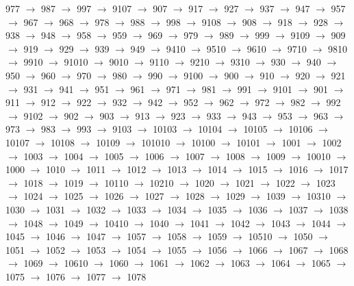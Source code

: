 977 $\rightarrow$ 987 $\rightarrow$ 997 $\rightarrow$ 9107 $\rightarrow$ 907 $\rightarrow$ 917 $\rightarrow$ 927 $\rightarrow$ 937 $\rightarrow$ 947 $\rightarrow$ 957 $\rightarrow$ 967 $\rightarrow$ 968 $\rightarrow$ 978 $\rightarrow$ 988 $\rightarrow$ 998 $\rightarrow$ 9108 $\rightarrow$ 908 $\rightarrow$ 918 $\rightarrow$ 928 $\rightarrow$ 938 $\rightarrow$ 948 $\rightarrow$ 958 $\rightarrow$ 959 $\rightarrow$ 969 $\rightarrow$ 979 $\rightarrow$ 989 $\rightarrow$ 999 $\rightarrow$ 9109 $\rightarrow$ 909 $\rightarrow$ 919 $\rightarrow$ 929 $\rightarrow$ 939 $\rightarrow$ 949 $\rightarrow$ 9410 $\rightarrow$ 9510 $\rightarrow$ 9610 $\rightarrow$ 9710 $\rightarrow$ 9810 $\rightarrow$ 9910 $\rightarrow$ 91010 $\rightarrow$ 9010 $\rightarrow$ 9110 $\rightarrow$ 9210 $\rightarrow$ 9310 $\rightarrow$ 930 $\rightarrow$ 940 $\rightarrow$ 950 $\rightarrow$ 960 $\rightarrow$ 970 $\rightarrow$ 980 $\rightarrow$ 990 $\rightarrow$ 9100 $\rightarrow$ 900 $\rightarrow$ 910 $\rightarrow$ 920 $\rightarrow$ 921 $\rightarrow$ 931 $\rightarrow$ 941 $\rightarrow$ 951 $\rightarrow$ 961 $\rightarrow$ 971 $\rightarrow$ 981 $\rightarrow$ 991 $\rightarrow$ 9101 $\rightarrow$ 901 $\rightarrow$ 911 $\rightarrow$ 912 $\rightarrow$ 922 $\rightarrow$ 932 $\rightarrow$ 942 $\rightarrow$ 952 $\rightarrow$ 962 $\rightarrow$ 972 $\rightarrow$ 982 $\rightarrow$ 992 $\rightarrow$ 9102 $\rightarrow$ 902 $\rightarrow$ 903 $\rightarrow$ 913 $\rightarrow$ 923 $\rightarrow$ 933 $\rightarrow$ 943 $\rightarrow$ 953 $\rightarrow$ 963 $\rightarrow$ 973 $\rightarrow$ 983 $\rightarrow$ 993 $\rightarrow$ 9103 $\rightarrow$ 10103 $\rightarrow$ 10104 $\rightarrow$ 10105 $\rightarrow$ 10106 $\rightarrow$ 10107 $\rightarrow$ 10108 $\rightarrow$ 10109 $\rightarrow$ 101010 $\rightarrow$ 10100 $\rightarrow$ 10101 $\rightarrow$ 1001 $\rightarrow$ 1002 $\rightarrow$ 1003 $\rightarrow$ 1004 $\rightarrow$ 1005 $\rightarrow$ 1006 $\rightarrow$ 1007 $\rightarrow$ 1008 $\rightarrow$ 1009 $\rightarrow$ 10010 $\rightarrow$ 1000 $\rightarrow$ 1010 $\rightarrow$ 1011 $\rightarrow$ 1012 $\rightarrow$ 1013 $\rightarrow$ 1014 $\rightarrow$ 1015 $\rightarrow$ 1016 $\rightarrow$ 1017 $\rightarrow$ 1018 $\rightarrow$ 1019 $\rightarrow$ 10110 $\rightarrow$ 10210 $\rightarrow$ 1020 $\rightarrow$ 1021 $\rightarrow$ 1022 $\rightarrow$ 1023 $\rightarrow$ 1024 $\rightarrow$ 1025 $\rightarrow$ 1026 $\rightarrow$ 1027 $\rightarrow$ 1028 $\rightarrow$ 1029 $\rightarrow$ 1039 $\rightarrow$ 10310 $\rightarrow$ 1030 $\rightarrow$ 1031 $\rightarrow$ 1032 $\rightarrow$ 1033 $\rightarrow$ 1034 $\rightarrow$ 1035 $\rightarrow$ 1036 $\rightarrow$ 1037 $\rightarrow$ 1038 $\rightarrow$ 1048 $\rightarrow$ 1049 $\rightarrow$ 10410 $\rightarrow$ 1040 $\rightarrow$ 1041 $\rightarrow$ 1042 $\rightarrow$ 1043 $\rightarrow$ 1044 $\rightarrow$ 1045 $\rightarrow$ 1046 $\rightarrow$ 1047 $\rightarrow$ 1057 $\rightarrow$ 1058 $\rightarrow$ 1059 $\rightarrow$ 10510 $\rightarrow$ 1050 $\rightarrow$ 1051 $\rightarrow$ 1052 $\rightarrow$ 1053 $\rightarrow$ 1054 $\rightarrow$ 1055 $\rightarrow$ 1056 $\rightarrow$ 1066 $\rightarrow$ 1067 $\rightarrow$ 1068 $\rightarrow$ 1069 $\rightarrow$ 10610 $\rightarrow$ 1060 $\rightarrow$ 1061 $\rightarrow$ 1062 $\rightarrow$ 1063 $\rightarrow$ 1064 $\rightarrow$ 1065 $\rightarrow$ 1075 $\rightarrow$ 1076 $\rightarrow$ 1077 $\rightarrow$ 1078 